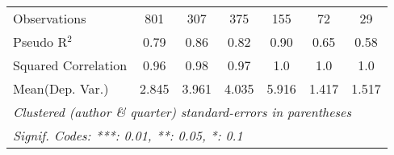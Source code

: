 \begin{tabular}{lcccccc}
   Observations                                               & 801         & 307           & 375        & 155     & 72     & 29\\  
   Pseudo R$^2$                                               & 0.79        & 0.86          & 0.82       & 0.90    & 0.65   & 0.58\\  
   Squared Correlation                                        & 0.96        & 0.98          & 0.97       & 1.0     & 1.0    & 1.0\\  
Mean(Dep. Var.) & 2.845 & 3.961 & 4.035 & 5.916 & 1.417 & 1.517 \\
   \midrule \midrule
   \multicolumn{7}{l}{\emph{Clustered (author \& quarter) standard-errors in parentheses}}\\
   \multicolumn{7}{l}{\emph{Signif. Codes: ***: 0.01, **: 0.05, *: 0.1}}\\
\end{tabular}
\par\endgroup
